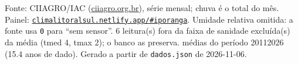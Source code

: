 \documentclass[10pt,a4paper]{article}
\begin{document}
\vspace{1pt}
{\tiny\color{cinza}
Fonte: CIIAGRO/IAC (\href{http://ciiagro.org.br}{ciiagro.org.br}), série mensal;
chuva é o total do mês. Painel:
\href{https://climalitoralsul.netlify.app/\#iporanga}%
{\texttt{climalitoralsul.netlify.app/\#iporanga}}.
Umidade relativa omitida: a fonte usa \texttt{0} para ``sem sensor''.  6 leitura(s) fora da faixa de sanidade excluída(s) da média (tmed 4, tmax 2); o banco as preserva.
médias do período 2011\textendash{}2026 (15.4 anos de dado).
Gerado a partir de \texttt{dados.json} de 2026-11-06.}
\end{document}
